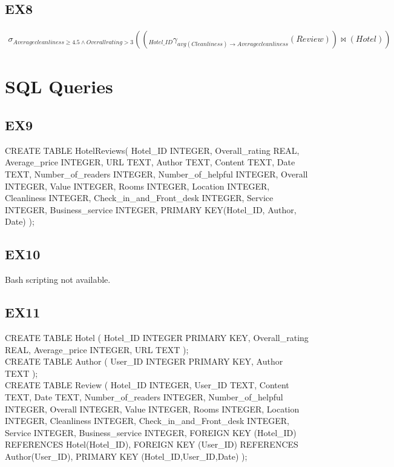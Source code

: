 \documentclass{article}
\begin{document}
	\subsection{EX8}
	\begin{eqnarray}
	\sigma _{Average cleanliness \geq 4.5 \wedge Overall rating > 3}((_{Hotel\_ID} \gamma _{avg(Cleanliness) \rightarrow Average cleanliness}(Review)) \bowtie (Hotel))
	\end{eqnarray}
	
	\section{SQL Queries}
	
	\subsection{EX9}
	CREATE TABLE HotelReviews(
	Hotel\_ID INTEGER,
	Overall\_rating REAL,
	Average\_price INTEGER,
	URL TEXT,
	Author TEXT,
	Content TEXT,
	Date TEXT,
	Number\_of\_readers INTEGER,
	Number\_of\_helpful INTEGER,
	Overall INTEGER,
	Value INTEGER,
	Rooms INTEGER,
	Location INTEGER,
	Cleanliness INTEGER,
	Check\_in\_and\_Front\_desk INTEGER,
	Service INTEGER,
	Business\_service INTEGER,
	PRIMARY KEY(Hotel\_ID, Author, Date)
	);
	
	\subsection{EX10}
	Bash scripting not available.
	
	\subsection{EX11}
	CREATE TABLE Hotel (
	Hotel\_ID INTEGER PRIMARY KEY,
	Overall\_rating REAL,
	Average\_price INTEGER,
	URL TEXT
	); 
	\\
	CREATE TABLE Author (
	User\_ID INTEGER PRIMARY KEY,
	Author TEXT
	);	
	\\
	CREATE TABLE Review (
	Hotel\_ID INTEGER,
	User\_ID TEXT,
	Content TEXT,
	Date TEXT,
	Number\_of\_readers INTEGER,
	Number\_of\_helpful INTEGER,
	Overall INTEGER,
	Value INTEGER,
	Rooms INTEGER,
	Location INTEGER,
	Cleanliness INTEGER,
	Check\_in\_and\_Front\_desk INTEGER,
	Service INTEGER,
	Business\_service INTEGER,
	FOREIGN KEY (Hotel\_ID) REFERENCES Hotel(Hotel\_ID),
	FOREIGN KEY (User\_ID) REFERENCES Author(User\_ID),
	PRIMARY KEY (Hotel\_ID,User\_ID,Date)
	);
	
	
\end{document}
